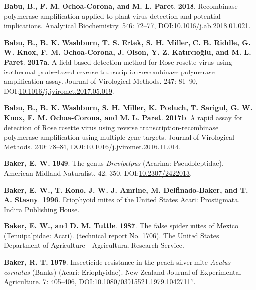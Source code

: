 \documentclass[12pt,final,CPage]{ufthesis}
\newlength{\cslhangindent}
\newenvironment{CSLReferences}[2] %
{%
	\setlength{\parindent}{0pt}
	\ifodd #1 \everypar{\setlength{\hangindent}{\cslhangindent}}\ignorespaces\fi
	\ifnum #2 > 0
	\setlength{\parskip}{#2\baselineskip}
	\fi
}%
{}
\begin{document}
{\begin{CSLReferences}{1}{0}
  \leavevmode{}%
  \textbf{Babu, B., F. M. Ochoa-Corona, and M. L. Paret}. \textbf{2018}. Recombinase polymerase amplification applied to plant virus detection and potential implications. Analytical Biochemistry. 546: 72--77, DOI:\href{https://doi.org/10.1016/j.ab.2018.01.021}{10.1016/j.ab.2018.01.021}.

  \leavevmode{}%
  \textbf{Babu, B., B. K. Washburn, T. S. Ertek, S. H. Miller, C. B. Riddle, G. W. Knox, F. M. Ochoa-Corona, J. Olson, Y. Z. Katırcıoğlu, and M. L. Paret}. \textbf{2017a}. A field based detection method for {Rose rosette virus} using isothermal probe-based reverse transcription-recombinase polymerase amplification assay. Journal of Virological Methods. 247: 81--90, DOI:\href{https://doi.org/10.1016/j.jviromet.2017.05.019}{10.1016/j.jviromet.2017.05.019}.

  \leavevmode{}%
  \textbf{Babu, B., B. K. Washburn, S. H. Miller, K. Poduch, T. Sarigul, G. W. Knox, F. M. Ochoa-Corona, and M. L. Paret}. \textbf{2017b}. A rapid assay for detection of {Rose rosette virus} using reverse transcription-recombinase polymerase amplification using multiple gene targets. Journal of Virological Methods. 240: 78--84, DOI:\href{https://doi.org/10.1016/j.jviromet.2016.11.014}{10.1016/j.jviromet.2016.11.014}.

  \leavevmode{}%
  \textbf{Baker, E. W.} \textbf{1949}. The genus {\emph{Brevipalpus}} ({Acarina}: {Pseudoleptidae}). American Midland Naturalist. 42: 350, DOI:\href{https://doi.org/10.2307/2422013}{10.2307/2422013}.

  \leavevmode{}%
  \textbf{Baker, E. W., T. Kono, J. W. J. Amrine, M. Delfinado-Baker, and T. A. Stasny}. \textbf{1996}. Eriophyoid mites of the {United States} {Acari}: {Prostigmata}. Indira Publishing House.

  \leavevmode{}%
  \textbf{Baker, E. W., and D. M. Tuttle}. \textbf{1987}. The false spider mites of {Mexico} ({Tenuipalpidae}: {Acari}). (technical report No. 1706). The {United States} Department of Agriculture - Agricultural Research Service.

  \leavevmode{}%
  \textbf{Baker, R. T.} \textbf{1979}. Insecticide resistance in the peach silver mite {\emph{Aculus cornutus}} {(Banks)} ({Acari}: {Eriophyidae}). New Zealand Journal of Experimental Agriculture. 7: 405--406, DOI:\href{https://doi.org/10.1080/03015521.1979.10427117}{10.1080/03015521.1979.10427117}.


\end{CSLReferences}}
\end{document}

